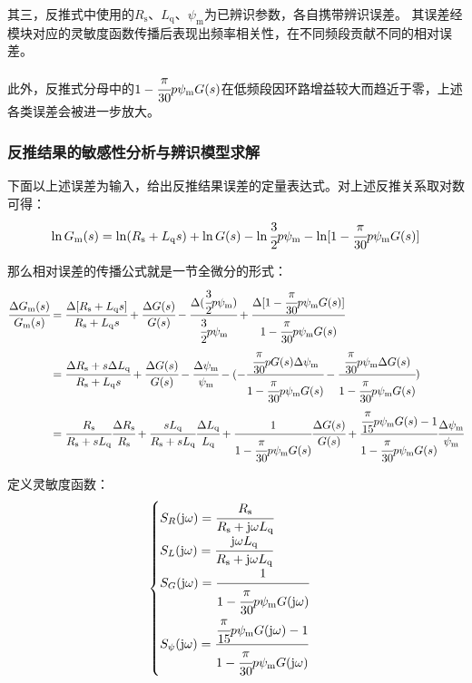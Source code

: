 其三，反推式中使用的\(R_{\mathrm{s}}\)、\(L_{\mathrm{q}}\)、\(\psi_{\mathrm{m}}\)为已辨识参数，各自携带辨识误差。
其误差经模块对应的灵敏度函数传播后表现出频率相关性，在不同频段贡献不同的相对误差。

此外，反推式分母中的\(1-\cfrac{\pi}{30}p\psi_{\mathrm{m}}G(s)\)在低频段因环路增益较大而趋近于零，上述各类误差会被进一步放大。

\subsubsection{反推结果的敏感性分析与辨识模型求解\label{sec:反推结果的敏感性分析}}
下面以上述误差为输入，给出反推结果误差的定量表达式。对上述反推关系取对数可得：
\begin{equation*}
    \ln G_{\mathrm{m}}(s)=\ln(R_{\mathrm{s}}+L_{\mathrm{q}}s)+\ln G(s)-\ln\cfrac{3}{2}p\psi_{\mathrm{m}}-\ln[1-\cfrac{\pi}{30}p\psi_{\mathrm{m}}G(s)]
\end{equation*}

那么相对误差的传播公式就是一节全微分的形式：
\begin{align*}
    \cfrac{\Delta G_{\mathrm{m}}(s)}{G_{\mathrm{m}}(s)}&=
    \cfrac{\Delta[R_{\mathrm{s}}+L_{\mathrm{q}}s]}{R_{\mathrm{s}}+L_{\mathrm{q}}s}
    +\cfrac{\Delta G(s)}{G(s)}-\cfrac{\Delta(\cfrac{3}{2}p\psi_{\mathrm{m}})}{\cfrac{3}{2}p\psi_{\mathrm{m}}}
    +\cfrac{\Delta[1-\cfrac{\pi}{30}p\psi_{\mathrm{m}}G(s)]}{1-\cfrac{\pi}{30}p\psi_{\mathrm{m}}G(s)}\\
    &=\cfrac{\Delta R_{\mathrm{s}}+s\Delta L_{\mathrm{q}}}{R_{\mathrm{s}}+L_{\mathrm{q}}s}+
    \cfrac{\Delta G(s)}{G(s)}-\cfrac{\Delta \psi_{\mathrm{m}}}{\psi_{\mathrm{m}}}-
    (-\cfrac{\cfrac{\pi}{30}pG(s)\Delta\psi_{\mathrm{m}}}{1-\cfrac{\pi}{30}p\psi_{\mathrm{m}}G(s)}
    -\cfrac{\cfrac{\pi}{30}p\psi_{\mathrm{m}}\Delta G(s)}{1-\cfrac{\pi}{30}p\psi_{\mathrm{m}}G(s)})\\
    &=\cfrac{R_{\mathrm{s}}}{R_{\mathrm{s}}+s L_{\mathrm{q}}}\cfrac{\Delta R_{\mathrm{s}}}{R_{\mathrm{s}}}+
    \cfrac{s L_{\mathrm{q}}}{R_{\mathrm{s}}+s L_{\mathrm{q}}}\cfrac{\Delta L_{\mathrm{q}}}{L_{\mathrm{q}}}+
    \cfrac{1}{1-\cfrac{\pi}{30}p\psi_{\mathrm{m}}G(s)}\cfrac{\Delta G(s)}{G(s)}+
    \cfrac{\cfrac{\pi}{15}p\psi_{\mathrm{m}}G(s)-1}{1-\cfrac{\pi}{30}p\psi_{\mathrm{m}}G(s)}\cfrac{\Delta\psi_{\mathrm{m}}}{\psi_{\mathrm{m}}}
\end{align*}

定义灵敏度函数：
\begin{equation}
    \begin{cases}
        S_{R}(\mathrm{j}\omega)=\cfrac{R_{\mathrm{s}}}{R_{\mathrm{s}}+\mathrm{j}\omega L_{\mathrm{q}}}\\
        S_{L}(\mathrm{j}\omega)=\cfrac{\mathrm{j}\omega L_{\mathrm{q}}}{R_{\mathrm{s}}+\mathrm{j}\omega L_{\mathrm{q}}}\\
        S_{G}(\mathrm{j}\omega)=\cfrac{1}{1-\cfrac{\pi}{30}p\psi_{\mathrm{m}}G(\mathrm{j}\omega)}\\
        S_{\psi}(\mathrm{j}\omega)=\cfrac{\cfrac{\pi}{15}p\psi_{\mathrm{m}}G(\mathrm{j}\omega)-1}{1-\cfrac{\pi}{30}p\psi_{\mathrm{m}}G(\mathrm{j}\omega)}
    \end{cases}
    \label{eq:灵敏度函数}
\end{equation}

